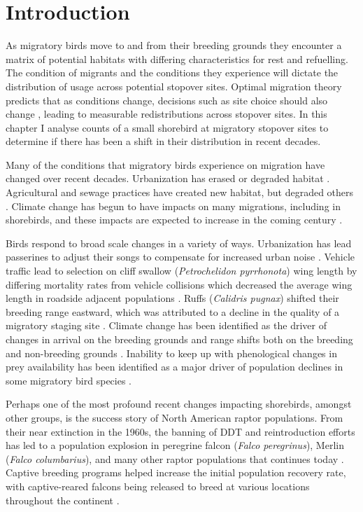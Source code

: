 \section{Introduction}

As migratory birds move to and from their breeding grounds they encounter a matrix of potential habitats with differing characteristics for rest and refuelling. The condition of migrants and the conditions they experience will dictate the distribution of usage across potential stopover sites. Optimal migration theory predicts that as conditions change, decisions such as site choice should also change \citep{Alerstam1990}, leading to measurable redistributions across stopover sites. In this chapter I analyse counts of a small shorebird at migratory stopover sites to determine if there has been a shift in their distribution in recent decades. 

Many of the conditions that migratory birds experience on migration have changed over recent decades. Urbanization has erased or degraded habitat \citep{Iwamura2013,Studds2017}. Agricultural and sewage practices have created new habitat, but degraded others \citep{Taft2006a,Alves2012}. Climate change has begun to have impacts on many migrations, including in shorebirds, and these impacts are expected to increase in the coming century \citep{Both2007,Gordo2007,cox2010bird,Sutherland2015}. 

Birds respond to broad scale changes in a variety of ways. Urbanization has lead passerines to adjust their songs to compensate for increased urban noise \citep{Patricelli2006,Wood2006}. Vehicle traffic lead to selection on cliff swallow (\textit{Petrochelidon pyrrhonota}) wing length by differing mortality rates from vehicle collisions which decreased the average wing length in roadside adjacent populations \citep{Brown2013}. Ruffs (\textit{Calidris pugnax}) shifted their breeding range eastward, which was attributed to a decline in the quality of a migratory staging site \citep{rakhimberdiev_global_2011}. Climate change has been identified as the driver of changes in arrival on the breeding grounds and range shifts both on the breeding and non-breeding grounds \citep{Gordo2007,Jonzen2006,cox2010bird,Hu2010,Gill20132161}. Inability to keep up with phenological changes in prey availability has been identified as a major driver of population declines in some migratory bird species \citep{Both2006,Jones2010,Fraser2013a}.

Perhaps one of the most profound recent changes impacting shorebirds, amongst other groups, is the success story of North American raptor populations. From their near extinction in the 1960s, the banning of DDT and reintroduction efforts has led to a population explosion in peregrine falcon (\textit{Falco peregrinus}), Merlin (\textit{Falco columbarius}), and many other raptor populations that continues today \citep{Cade1988,Cava2014,Ydenberg2017}. Captive breeding programs helped increase the initial population recovery rate, with captive-reared falcons being released to breed at various locations throughout the continent \citep{amirault20041995,Gahbauer2015,Watts2015}. 

